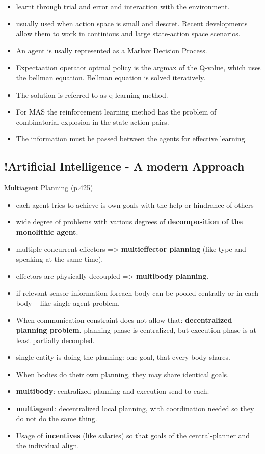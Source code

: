 \begin{itemize}
\begin{itemize}[noitemsep,nolistsep]
		\item learnt through trial and error and interaction with the environment.
		\item usually used when action space is small and descret. Recent developments allow them to work in continious and large state-action space scenarios.
		\item An agent is usally represented as a Markov Decision Process.
		\item Expectaation operator optmal policy is the argmax of the Q-value, which uses the bellman equation. Bellman equation is solved iteratively.
		\item The solution is referred to as q-learning method.
		\item For MAS the reinforcement learning method has the problem of combinatorial explosion in the state-action pairs.
		\item The information must be passed between the agents for effective learning.
	\end{itemize}
\end{itemize}

\subsection{!Artificial Intelligence - A modern Approach}
\underline{Multiagent Planning (p.425)}
\begin{itemize}[noitemsep,nolistsep]
	\item each agent tries to achieve is own goals with the help or hindrance of others
	\item wide degree of problems with various degrees of \textbf{decomposition of the monolithic agent}.
	\item multiple concurrent effectors => \textbf{multieffector planning} (like type and speaking at the same time).
	\item effectors are physically decoupled => \textbf{multibody planning}.
	\item if relevant sensor information foreach body can be pooled centrally or in each body ~ like single-agent problem.
	\item When communication constraint does not allow that: \textbf{decentralized planning problem}. planning phase is centralized, but execution phase is at least partially decoupled.
	\item single entity is doing the planning: one goal, that every body shares.
	\item When bodies do their own planning, they may share identical goals.
	\item \textbf{multibody}: centralized planning and execution send to each.
	\item \textbf{multiagent}: decentralized local planning, with coordination needed so they do not do the same thing.
	\item Usage of \textbf{incentives} (like salaries) so that goals of the central-planner and the individual align.
\end{itemize}

